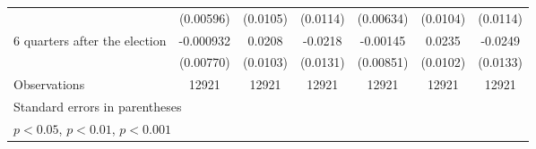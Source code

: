 \begin{table}[htbp]
\begin{tabular}{l*{6}{c}}
                    &   (0.00596)         &    (0.0105)         &    (0.0114)         &   (0.00634)         &    (0.0104)         &    (0.0114)         \\
[1em]
 6 quarters after the election&   -0.000932         &      0.0208\sym{*}  &     -0.0218         &    -0.00145         &      0.0235\sym{*}  &     -0.0249         \\
                    &   (0.00770)         &    (0.0103)         &    (0.0131)         &   (0.00851)         &    (0.0102)         &    (0.0133)         \\
\hline
Observations        &       12921         &       12921         &       12921         &       12921         &       12921         &       12921         \\
\hline\hline
\multicolumn{7}{l}{\footnotesize Standard errors in parentheses}\\
\multicolumn{7}{l}{\footnotesize \sym{*} \(p<0.05\), \sym{**} \(p<0.01\), \sym{***} \(p<0.001\)}\\
\end{tabular}
\end{table}
